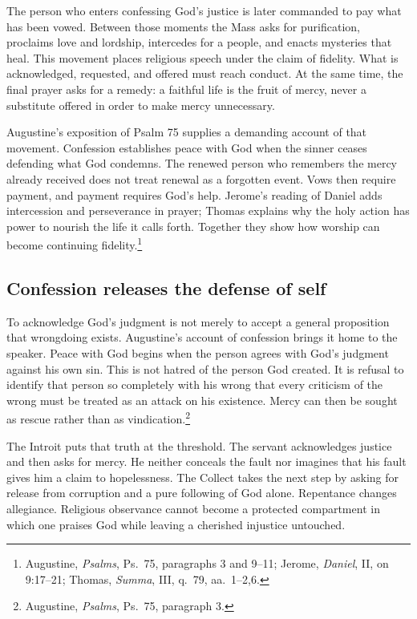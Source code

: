 
The person who enters confessing God's justice is later commanded to pay what has been vowed. Between those moments the Mass asks for purification, proclaims love and lordship, intercedes for a people, and enacts mysteries that heal. This movement places religious speech under the claim of fidelity. What is acknowledged, requested, and offered must reach conduct. At the same time, the final prayer asks for a remedy: a faithful life is the fruit of mercy, never a substitute offered in order to make mercy unnecessary.

Augustine's exposition of Psalm 75 supplies a demanding account of that movement. Confession establishes peace with God when the sinner ceases defending what God condemns. The renewed person who remembers the mercy already received does not treat renewal as a forgotten event. Vows then require payment, and payment requires God's help. Jerome's reading of Daniel adds intercession and perseverance in prayer; Thomas explains why the holy action has power to nourish the life it calls forth. Together they show how worship can become continuing fidelity.\footnote{Augustine, \textit{Psalms}, Ps.~75, paragraphs 3 and 9--11; Jerome, \textit{Daniel}, II, on 9:17--21; Thomas, \textit{Summa}, III, q.~79, aa.~1--2,6.}

\subsection{Confession releases the defense of self}
To acknowledge God's judgment is not merely to accept a general proposition that wrongdoing exists. Augustine's account of confession brings it home to the speaker. Peace with God begins when the person agrees with God's judgment against his own sin. This is not hatred of the person God created. It is refusal to identify that person so completely with his wrong that every criticism of the wrong must be treated as an attack on his existence. Mercy can then be sought as rescue rather than as vindication.\footnote{Augustine, \textit{Psalms}, Ps.~75, paragraph 3.}

The Introit puts that truth at the threshold. The servant acknowledges justice and then asks for mercy. He neither conceals the fault nor imagines that his fault gives him a claim to hopelessness. The Collect takes the next step by asking for release from corruption and a pure following of God alone. Repentance changes allegiance. Religious observance cannot become a protected compartment in which one praises God while leaving a cherished injustice untouched.

